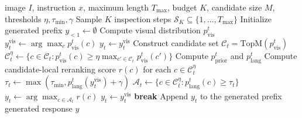 \documentclass[11pt]{article}
\begin{document}
  \begin{algorithm}[H]
  \small
  \caption{Sparse Guarded Reranking (SGR)}
  \label{alg:sparse-guarded-decoding}
  \begin{algorithmic}[1]
  \Require image $I$, instruction $x$, maximum length $T_{\max}$, budget $K$, candidate size $M$, thresholds $\eta,\tau_{\min},\gamma$
  \State Sample $K$ inspection steps $\mathcal{S}_K \subseteq \{1,\ldots,T_{\max}\}$
  \State Initialize generated prefix $y_{<1} \leftarrow \emptyset$
      \State Compute visual distribution $p_{\mathrm{vis}}^t$
      \State $y_t^{\mathrm{vis}} \leftarrow \arg\max_c p_{\mathrm{vis}}^t(c)$
          \State $y_t \leftarrow y_t^{\mathrm{vis}}$
      \Else
          \State Construct candidate set $\mathcal{C}_t = \mathrm{TopM}(p_{\mathrm{vis}}^t)$
          \State $\mathcal{C}_t^{\eta} \leftarrow \{c \in \mathcal{C}_t : p_{\mathrm{vis}}^t(c) \ge \eta \max_{c' \in \mathcal{C}_t} p_{\mathrm{vis}}^t(c')\}$
          \State Compute $p_{\mathrm{prior}}^t$ and $p_{\mathrm{lang}}^t$
          \State Compute candidate-local reranking score $r(c)$ for each $c \in \mathcal{C}_t^{\eta}$
          \State $\tau_t \leftarrow \max(\tau_{\min}, p_{\mathrm{lang}}^t(y_t^{\mathrm{vis}})+\gamma)$
          \State $\mathcal{A}_t \leftarrow \{c \in \mathcal{C}_t^{\eta}: p_{\mathrm{lang}}^t(c) \ge \tau_t\}$
              \State $y_t \leftarrow \arg\max_{c \in \mathcal{A}_t} r(c)$
          \Else
              \State $y_t \leftarrow y_t^{\mathrm{vis}}$
          \EndIf
      \EndIf
          \State \textbf{break}
      \EndIf
      \State Append $y_t$ to the generated prefix
  \EndFor
  \State \Return generated response $y$
  \end{algorithmic}
  \end{algorithm}
\end{document}
